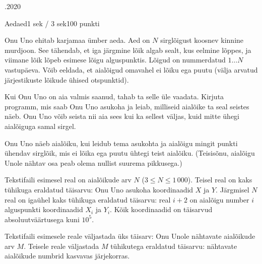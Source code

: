 \documentclass[a4paper,11pt]{article}
\begin{document}
\begin{ol}{\eio}{.2020}{\yle}{}
\begin{yl}{1}{Aed}{aed}{1 sek / 3 sek}{100 punkti}

Onu Uno ehitab karjamaa ümber aeda. Aed on $N$ sirglõigust koosnev kinnine murdjoon. See tähendab, et iga järgmine lõik algab sealt, kus eelmine lõppes, ja viimane lõik lõpeb esimese lõigu alguspunktis. Lõigud on nummerdatud $1 \ldots N$ vastupäeva. Võib eeldada, et aialõigud omavahel ei lõiku ega puutu (välja arvatud järjestikuste lõikude ühised otspunktid).

Kui Onu Uno on aia valmis saanud, tahab ta selle üle vaadata. Kirjuta programm, mis saab Onu Uno asukoha ja leiab, milliseid aialõike ta seal seistes näeb. Onu Uno võib seista nii aia sees kui ka sellest väljas, kuid mitte ühegi aialõiguga samal sirgel.

Onu Uno näeb aialõiku, kui leidub tema asukohta ja aialõigu mingit punkti ühendav sirglõik, mis ei lõika ega puutu ühtegi teist aialõiku. (Teisisõnu, aialõigu Unole nähtav osa peab olema nullist suurema pikkusega.)

\sis Tekstifaili \sisf esimesel real on aialõikude arv $N$ ($3 \le N \le 1\,000$). Teisel real on kaks tühikuga eraldatud täisarvu: Onu Uno asukoha koordinaadid $X$ ja $Y$. Järgmisel $N$ real on igaühel kaks tühikuga eraldatud täisarvu: real $i + 2$ on aialõigu number $i$ alguspunkti koordinaadid $X_i$ ja $Y_i$. Kõik koordinaadid on täisarvud absoluutväärtusega kuni $10^5$.

\val Tekstifaili \valf esimesele reale väljastada üks täisarv: Onu Unole nähtavate aialõikude arv $M$. Teisele reale väljastada $M$ tühikutega eraldatud täisarvu: nähtavate aialõikude numbrid kasvavas järjekorras.

\begin{wrapfigure}[1]{r}{0.3\textwidth}
\vskip -20pt
\vskip 10pt
\vskip 10pt
\end{wrapfigure}


\end{yl}
\end{ol}
\end{document}
